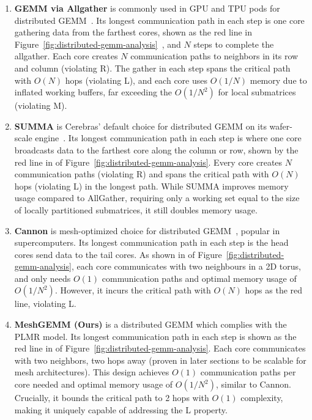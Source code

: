 \begin{enumerate}[label=(\arabic*), leftmargin=0.5cm, noitemsep,topsep=0pt]
\item \textbf{GEMM via Allgather} is commonly used in GPU and TPU pods for distributed GEMM~\cite{google2023efficiently, tensorrt-llm, megatron}. Its longest communication path in each step is one core gathering data from the farthest cores, shown as the red line in Figure~\ref{fig:distributed-gemm-analysis}~, and $N$ steps to complete the allgather. Each core creates $N$ communication paths to neighbors in its row and column (violating R). The gather in each step spans the critical path with $O(N)$ hops (violating L), and each core uses $O(1/N)$ memory due to inflated working buffers, far exceeding the $O(1/N^2)$ for local submatrices (violating M).

\item \textbf{SUMMA} is Cerebras' default choice for distributed GEMM on its wafer-scale engine~\cite{cerebrasgemm}. Its longest communication path in each step is where one core broadcasts data to the farthest core along the column or row, shown by the red line in  of Figure~\ref{fig:distributed-gemm-analysis}. Every core creates $N$ communication paths (violating R) and spans the critical path with $O(N)$ hops (violating L) in the longest path. While SUMMA improves memory usage compared to AllGather, requiring only a working set equal to the size of locally partitioned submatrices, it still doubles memory usage.

\item \textbf{Cannon} is mesh-optimized choice for distributed GEMM~\cite{cannon}, popular in supercomputers. 
Its longest communication path in each step is the head cores send data to the tail cores.
As shown in  of Figure~\ref{fig:distributed-gemm-analysis}, each core communicates with two neighbours in a 2D torus, and only needs $O(1)$ communication paths and optimal memory usage of $O(1/N^2)$. However, it incurs the critical path with $O(N)$ hops as the red line, violating L.

\item \textbf{MeshGEMM (Ours)} is a distributed GEMM which complies with the PLMR model. Its longest communication path in each step is shown as the red line in  of Figure~\ref{fig:distributed-gemm-analysis}. Each core communicates with two neighbors, two hops away (proven in later sections to be scalable for mesh architectures). This design achieves $O(1)$ communication paths per core needed and optimal memory usage of $O(1/N^2)$, similar to Cannon. Crucially, it bounds the critical path to 2 hops with $O(1)$ complexity, making it uniquely capable of addressing the L property.

\end{enumerate}


